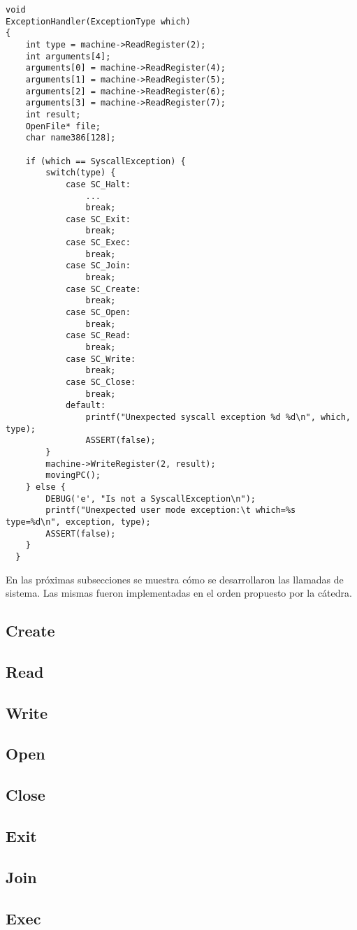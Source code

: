 \begin{lstlisting}[style=C]
void
ExceptionHandler(ExceptionType which)
{
    int type = machine->ReadRegister(2);
    int arguments[4];
    arguments[0] = machine->ReadRegister(4);
    arguments[1] = machine->ReadRegister(5);
    arguments[2] = machine->ReadRegister(6);
    arguments[3] = machine->ReadRegister(7);
    int result;
    OpenFile* file;
    char name386[128];

    if (which == SyscallException) {
    	switch(type) {
            case SC_Halt:
                ...
                break;
            case SC_Exit:
                break;
            case SC_Exec:
                break;
            case SC_Join:
                break;
            case SC_Create:
                break;
            case SC_Open:
                break;
            case SC_Read:
                break;
            case SC_Write:
                break;
            case SC_Close:
                break;
            default: 
                printf("Unexpected syscall exception %d %d\n", which, type);
                ASSERT(false);
    	}
        machine->WriteRegister(2, result);
    	movingPC();
    } else {
        DEBUG('e', "Is not a SyscallException\n");
        printf("Unexpected user mode exception:\t which=%s  type=%d\n", exception, type);
        ASSERT(false);
    }
  }
\end{lstlisting}

En las próximas subsecciones se muestra cómo se desarrollaron las llamadas de sistema. Las mismas fueron implementadas en el orden propuesto por la cátedra.\\


\subsection*{Create}
\subsection*{Read}
\subsection*{Write}
\subsection*{Open}
\subsection*{Close}
\subsection*{Exit}
\subsection*{Join}
\subsection*{Exec}
\section{}
\section{}
\section{}